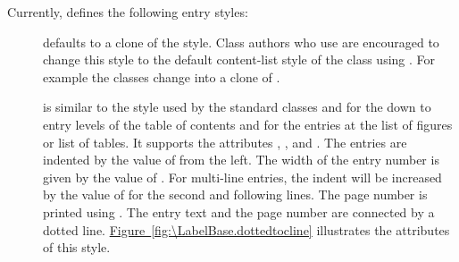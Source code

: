 Currently,  defines the following entry styles:
\begin{description}
\item[] defaults to a clone of the 
  style. Class authors who use  are encouraged to change
  this style to the default content-list style of the class using
  . For example the \KOMAScript{} classes change
   into a clone of .
\item[] is similar to the style used by the standard
  classes  and  for the  down to
   entry levels of the table of contents and for the
  entries at the list of figures or list of tables. It supports the attributes
  , , and . The entries are
  indented by the value of  from the left. The width of the
  entry number is given by the value of . For multi-line
  entries, the indent will be increased by the value of  for
  the second and following lines. The page number is printed using
  . The entry text and the page number
  are connected by a dotted line. \hyperref[fig:\LabelBase.dottedtocline]%
  {Figure~\ref*{fig:\LabelBase.dottedtocline}} illustrates the attributes of
  this style.
  \begin{figure}
    \centering
\end{figure}
\end{description}
